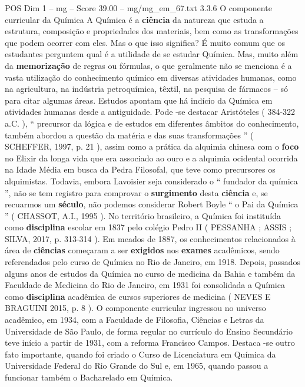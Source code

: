 \begin{textsample}{POS Dim 1 – mg – Score 39.00 – mg/mg\_em\_67.txt}  \label{ex:f1_pos_238}
3.3.6 O componente curricular da Química A Química é a \textbf{ciência} da natureza que estuda a estrutura, composição e propriedades dos materiais, bem como as transformações que podem ocorrer com eles.
Mas o que isso significa?
É muito comum que os estudantes perguntem qual é a utilidade de se estudar Química.
Mas, muito além da \textbf{memorização} de regras ou fórmulas, o que geralmente não se menciona é a vasta utilização do conhecimento químico em diversas atividades humanas, como na agricultura, na indústria petroquímica, têxtil, na pesquisa de fármacos – só para citar algumas áreas.
Estudos apontam que há indício da Química em atividades humanas desde a antiguidade.
Pode -se destacar Aristóteles ( 384-322 a.C. ), “ precursor da lógica e de estudos em diferentes âmbitos do conhecimento, também abordou a questão da matéria e das suas transformações ” ( SCHEFFER, 1997, p. 21 ), assim como a prática da alquimia chinesa com o \textbf{foco} no Elixir da longa vida que era associado ao ouro e a alquimia ocidental ocorrida na Idade Média em busca da Pedra Filosofal, que teve como precursores os alquimistas.
Todavia, embora Lavoisier seja considerado o “ fundador da química ”, não se tem registro para comprovar o \textbf{surgimento} desta \textbf{ciência} e, se recuarmos um \textbf{século}, não podemos considerar Robert Boyle “ o Pai da Química ” ( CHASSOT, A.I., 1995 ).
No território brasileiro, a Química foi instituída como \textbf{disciplina} escolar em 1837 pelo colégio Pedro II ( PESSANHA ; ASSIS ; SILVA, 2017, p. 313-314 ).
Em meados de 1887, os conhecimentos relacionados à área de \textbf{ciências} começaram a ser \textbf{exigidos} nos \textbf{exames} acadêmicos, sendo referendados pelo curso de Química no Rio de Janeiro, em 1918.
Depois, passados alguns anos de estudos da Química no curso de medicina da Bahia e também da Faculdade de Medicina do Rio de Janeiro, em 1931 foi consolidada a Química como \textbf{disciplina} acadêmica de cursos superiores de medicina ( NEVES E BRAGUINI 2015, p. 8 ).
O componente curricular ingressou no universo acadêmico, em 1934, com a Faculdade de Filosofia, Ciências e Letras da Universidade de São Paulo, de forma regular no currículo do Ensino Secundário teve início a partir de 1931, com a reforma Francisco Campos.
Destaca -se outro fato importante, quando foi criado o Curso de Licenciatura em Química da Universidade Federal do Rio Grande do Sul e, em 1965, quando passou a funcionar também o Bacharelado em Química.

\end{textsample}
